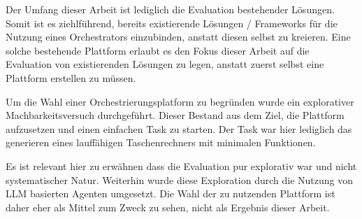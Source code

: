 



Der Umfang dieser Arbeit ist lediglich die Evaluation bestehender Lösungen. Somit ist es ziehlführend, bereits existierende Lösungen / Frameworks für die Nutzung eines Orchestrators einzubinden, anstatt diesen selbst zu kreieren. Eine solche bestehende Plattform erlaubt es den Fokus dieser Arbeit auf die Evaluation von existierenden Lösungen zu legen, anstatt zuerst selbst eine Plattform erstellen zu müssen.

Um die Wahl einer Orchestrierungsplatform zu begründen wurde ein explorativer Machbarkeitsversuch durchgeführt. Dieser Bestand aus dem Ziel, die Plattform aufzusetzen und einen einfachen Task zu starten. Der Task war hier lediglich das generieren eines lauffähigen Taschenrechners mit minimalen Funktionen. 

Es ist relevant hier zu erwähnen dass die Evaluation pur explorativ war und nicht systematischer Natur. Weiterhin wurde diese Exploration durch die Nutzung von LLM basierten Agenten umgesetzt. Die Wahl der zu nutzenden Plattform ist daher eher als Mittel zum Zweck zu sehen, nicht als Ergebnis dieser Arbeit.

